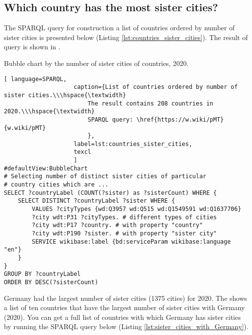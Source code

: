\subsection{Which country has the most sister cities?}

The SPARQL query for construction a list of countries ordered by number of sister cities is presented below (Listing \ref{lst:countries_sister_cities}). The result of query is shown in .

\begin{marginfigure}[2cm]
{
\setlength{\fboxsep}{0pt}%
\setlength{\fboxrule}{1pt}%
}
	\caption{Bubble chart by the number of sister cities of countries, 2020.}
\end{marginfigure}

\begin{lstlisting}[ language=SPARQL, 
                    caption={List of countries ordered by number of sister cities.\\\hspace{\textwidth}
                        The result contains 208 countries in 2020.\\\hspace{\textwidth}
                        SPARQL query: \href{https://w.wiki/pMT}{w.wiki/pMT}
                        },
                    label=lst:countries_sister_cities,
                    texcl 
                    ]
#defaultView:BubbleChart
# Selecting number of distinct sister cities of particular  
# country cities which are ... 
SELECT ?countryLabel (COUNT(?sister) as ?sisterCount) WHERE { 
	SELECT DISTINCT ?countryLabel ?sister WHERE {
		VALUES ?cityTypes {wd:Q3957 wd:Q515 wd:Q1549591 wd:Q1637706}
		?city wdt:P31 ?cityTypes. # different types of cities
		?city wdt:P17 ?country. # with property "country"
		?city wdt:P190 ?sister. # with property "sister city"
		SERVICE wikibase:label {bd:serviceParam wikibase:language "en"}
	}                                 
}
GROUP BY ?countryLabel
ORDER BY DESC(?sisterCount)
\end{lstlisting}%

Germany had the largest number of sister cities (1375 cities) for 2020. The  shows a list of ten countries that have the largest number of sister cities with Germany (2020). You can get a full list of countries with which Germany has sister cities by running the SPARQL query below (Listing \ref{lst:sister_cities_with_Germany}).

